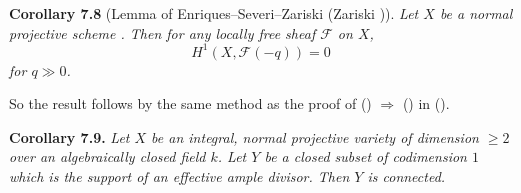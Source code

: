 {\medskip
\noindent\hypertarget{result-III-7.8}{}\textbf{Corollary 7.8} (Lemma of Enriques--Severi--Zariski (Zariski )). \emph{Let $X$ be a normal projective scheme . Then for any locally free sheaf $\mathcal F$ on $X$,}
\[
H^1(X,\mathcal F(-q))=0
\]
\noindent\emph{for $q\gg0$.}

\Proof {} So the result follows by the same method as the proof of () $\Rightarrow$ () in ().

\medskip
\noindent\hypertarget{result-III-7.9}{}\textbf{Corollary 7.9.} \emph{Let $X$ be an integral, normal projective variety of dimension $\ge2$ over an algebraically closed field $k$. Let $Y$ be a closed subset of codimension $1$ which is the support of an effective ample divisor. Then $Y$ is connected.}
}
